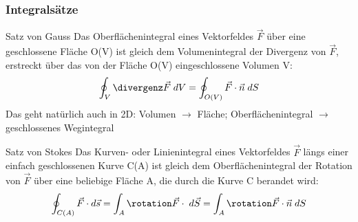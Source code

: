 \begin{frame}
\begin{columns}[t]
\begin{column}{.52\linewidth}
    \end{column}
  \end{columns}

\end{frame}


\begin{frame}
  \frametitle{Integralsätze}
  \begin{block}{Satz von Gauss}
Das Oberflächenintegral eines Vektorfeldes $\vec{F}$ über eine geschlossene Fläche O(V) ist
gleich dem Volumenintegral der Divergenz von
$\vec{F}$, erstreckt über das von der
Fläche O(V) eingeschlossene Volumen V:
\begin{align*}
\oint_V \divergenz\vec{F} \; dV = \oint_{O(V)} \vec{F} \cdot \vec{n} \; dS
\end{align*}\pause
Das geht natürlich auch in 2D: Volumen $\to$ Fläche; Oberflächenintegral
$\to$ geschlossenes Wegintegral
\end{block}\pause

    \begin{block}{Satz von Stokes}
      Das Kurven- oder Linienintegral eines Vektorfeldes $\vec{F}$ längs einer einfach
geschlossenen Kurve C(A) ist gleich dem Oberflächenintegral der Rotation von
$\vec{F}$ über eine beliebige Fläche A, die durch die Kurve C berandet wird:
\begin{equation*}
  \oint_{C(A)} \vec{F}\cdot d\vec{s} = \int_A\rotation\vec{F} \cdot
\;  d\vec{S} = \int_A\rotation\vec{F} \cdot
 \vec{n}\; dS 
 \end{equation*}
\end{block}
\end{frame}


